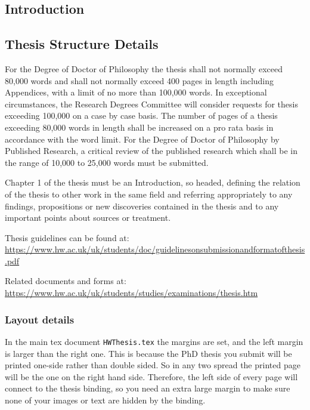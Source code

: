 \documentclass[../HWThesis.tex]{subfiles} %
\begin{document}
\begin{refsection}
\chapter{Introduction}
\label{ch:introduction}

\section{Thesis Structure Details}
\label{sec: thesis details}
For the Degree of Doctor of Philosophy the thesis shall not normally exceed 80,000 words and shall not normally exceed 400 pages in length including Appendices, with a limit of no more than 100,000 words. In exceptional circumstances, the Research Degrees Committee will consider requests for thesis exceeding 100,000 on a case by case basis. The number of pages of a thesis exceeding 80,000 words in length shall be increased on a pro rata basis in accordance with the word limit.  For the Degree of Doctor of Philosophy by Published Research, a critical review of the published research which shall be in the range of 10,000 to 25,000 words must be submitted.

Chapter 1 of the thesis must be an Introduction, so headed, defining the relation of the thesis to other work in the same field and referring appropriately to any findings, propositions or new discoveries contained in the thesis and to any important points about sources or treatment.

Thesis guidelines can be found at: \\ \url{https://www.hw.ac.uk/uk/students/doc/guidelinesonsubmissionandformatofthesis.pdf}

Related documents and forms at: \url{https://www.hw.ac.uk/uk/students/studies/examinations/thesis.htm}

\subsection{Layout details}
\label{sec: layout}
In the main tex document \texttt{HWThesis.tex} the margins are set, and the left margin is larger than the right one. This is because the PhD thesis you submit will be printed one-side rather than double sided. So in any two spread the printed page will be the one on the right hand side. Therefore, the left side of every page will connect to the thesis binding, so you need an extra large margin to make sure none of your images or text are hidden by the binding.


\end{refsection}
\end{document}
